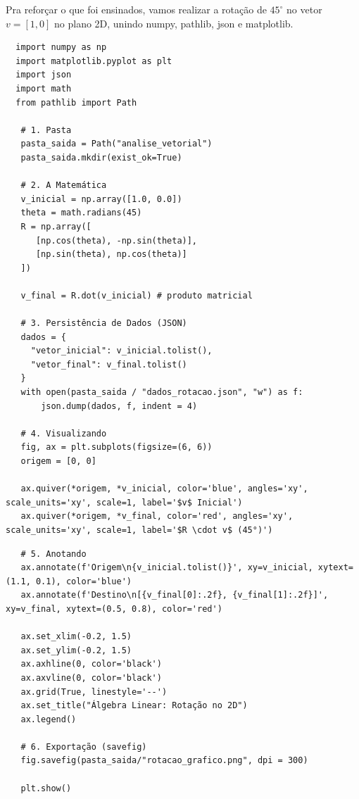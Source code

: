 \documentclass[../numerical_methods.tex]{subfiles}
\begin{document}
Pra reforçar o que foi ensinados, vamos realizar a rotação de \(45^{\circ }\) no vetor \(v=[1, 0]\) no plano 2D, unindo numpy, pathlib, json e matplotlib.

\begin{listing}[H]
	\caption{Rodando Vetores}
	\begin{verbatim}
  import numpy as np
  import matplotlib.pyplot as plt
  import json
  import math
  from pathlib import Path
 
   # 1. Pasta 
   pasta_saida = Path("analise_vetorial")
   pasta_saida.mkdir(exist_ok=True)

   # 2. A Matemática 
   v_inicial = np.array([1.0, 0.0])
   theta = math.radians(45)
   R = np.array([
      [np.cos(theta), -np.sin(theta)],
      [np.sin(theta), np.cos(theta)]
   ])

   v_final = R.dot(v_inicial) # produto matricial

   # 3. Persistência de Dados (JSON)
   dados = {
     "vetor_inicial": v_inicial.tolist(), 
     "vetor_final": v_final.tolist()
   }
   with open(pasta_saida / "dados_rotacao.json", "w") as f:
       json.dump(dados, f, indent = 4)

   # 4. Visualizando 
   fig, ax = plt.subplots(figsize=(6, 6))
   origem = [0, 0]

   ax.quiver(*origem, *v_inicial, color='blue', angles='xy', scale_units='xy', scale=1, label='$v$ Inicial')
   ax.quiver(*origem, *v_final, color='red', angles='xy', scale_units='xy', scale=1, label='$R \cdot v$ (45°)')
\end{verbatim}
\end{listing}

\begin{listing}[H]
	\begin{verbatim}
   # 5. Anotando
   ax.annotate(f'Origem\n{v_inicial.tolist()}', xy=v_inicial, xytext=(1.1, 0.1), color='blue')
   ax.annotate(f'Destino\n[{v_final[0]:.2f}, {v_final[1]:.2f}]', xy=v_final, xytext=(0.5, 0.8), color='red')

   ax.set_xlim(-0.2, 1.5)
   ax.set_ylim(-0.2, 1.5)
   ax.axhline(0, color='black')
   ax.axvline(0, color='black')
   ax.grid(True, linestyle='--')
   ax.set_title("Álgebra Linear: Rotação no 2D")
   ax.legend()

   # 6. Exportação (savefig)
   fig.savefig(pasta_saida/"rotacao_grafico.png", dpi = 300)

   plt.show()
 \end{verbatim}
\end{listing}
\end{document}
